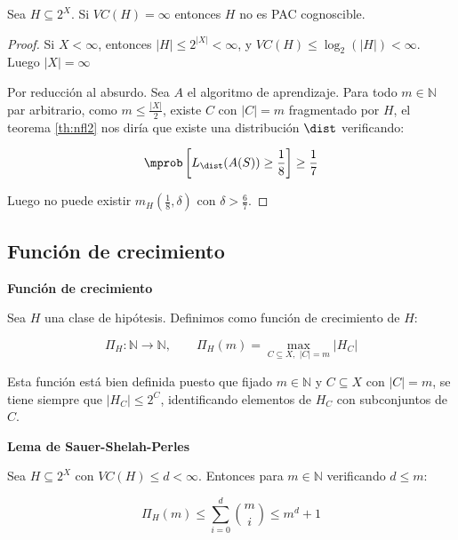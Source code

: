 \begin{corollary}
 Sea $H \subseteq 2^X$. Si $VC(H) = \infty$ entonces $H$ no es PAC cognoscible.
 \label{cor:vc-finito}
\end{corollary}

  \begin{proof}
  Si $X < \infty$, entonces $|H| \le 2^{|X|} < \infty$, y $VC(H) \le \log_2(|H|) < \infty$. Luego $|X| = \infty$
  
  Por reducción al absurdo. Sea $A$ el algoritmo de aprendizaje. Para todo $m\in \mathbb{N}$ par arbitrario, como 
  $m\le \frac{|X|}{2}$, existe $C$ con $|C| = m$ fragmentado por $H$, el teorema \ref{th:nfl2} nos diría que existe una 
  distribución $\dist$ verificando:
 
  \[\mprob \left[ L_{\dist}(A(S)) \ge \frac{1}{8} \right] \ge \frac{1}{7}\]
 
  Luego no puede existir $m_H \left(\frac{1}{8}, \delta\right)$ con $\delta > \frac{6}{7}$.
  \end{proof}
  
\subsection{Función de crecimiento}

\begin{definition}
\textbf{Función de crecimiento}

Sea $H$ una clase de hipótesis. Definimos como función de crecimiento de $H$:

\[\Pi_{H}: \mathbb{N} \longrightarrow \mathbb{N}, \qquad \Pi_{H}(m) = \max_{C \subseteq X, \,\, |C|=m} |H_C|\]
\end{definition}

Esta función está bien definida puesto que fijado $m \in \mathbb{N}$ y $C\subseteq X$ con $|C| = m$, se tiene siempre 
que $|H_C| \le 2^C$, identificando elementos de $H_C$ con subconjuntos de $C$.

\begin{lemma} \textbf{Lema de Sauer-Shelah-Perles}

Sea $H \subseteq 2^X$ con $VC(H) \le d < \infty$. Entonces para $m\in \mathbb{N}$ verificando $d\le m$:

\[\Pi_{H} (m) \le \sum_{i=0}^d \binom{m}{i} \le m^d + 1\]
\label{lemma:sauer}
\end{lemma}


